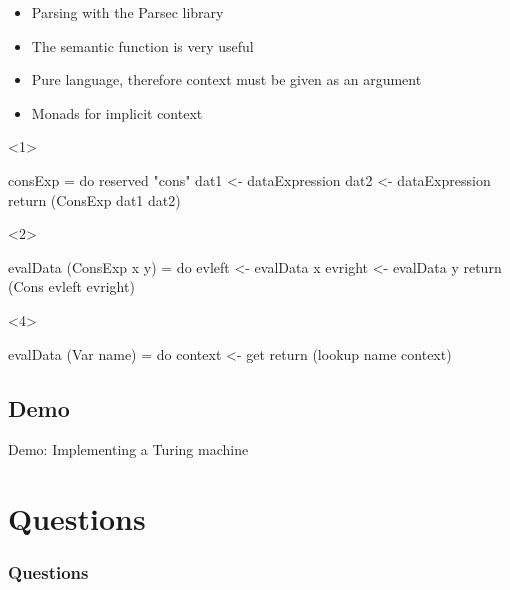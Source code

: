 \documentclass{beamer}
\theoremstyle{definition}
\begin{document}
\begin{frame}[t, fragile]
	\begin{itemize}[<+->]
		\item Parsing with the Parsec library
		\item The semantic function is very useful
		\item Pure language, therefore context must be given as an argument
		\item Monads for implicit context
	\end{itemize}
	\begin{onlyenv}
\begin{code}
consExp = do 
  reserved "cons"
  dat1 <- dataExpression
  dat2 <- dataExpression
  return (ConsExp dat1 dat2)
\end{code}
\end{onlyenv}
	\begin{onlyenv}
\begin{code}
evalData (ConsExp x y) = do
  evleft  <- evalData x
  evright <- evalData y
  return (Cons evleft evright)
\end{code}
\end{onlyenv}
	\begin{onlyenv}
\begin{code}
evalData (Var name) = do
  context <- get
  return (lookup name context)
\end{code}
\end{onlyenv}
\end{frame}

\subsection{Demo}
\begin{frame}{Demo: Implementing a Turing machine}
\end{frame}

\section{Questions}
\begin{frame}
	\frametitle{Questions}
\end{frame}
\end{document}

